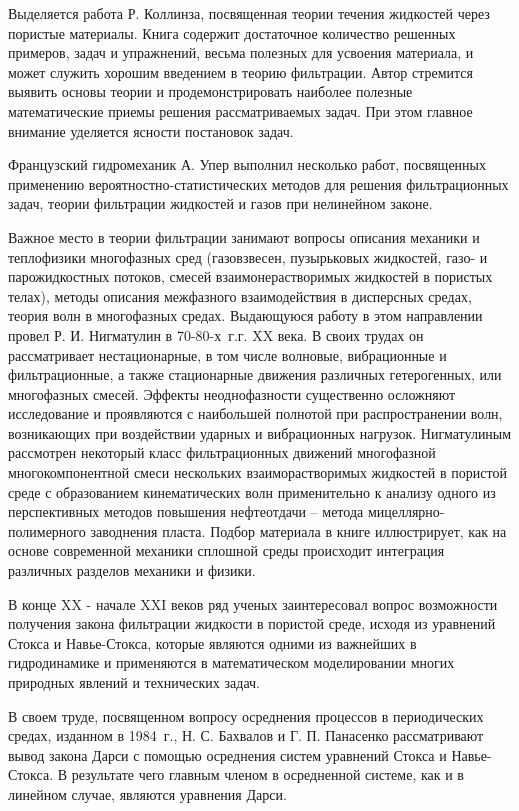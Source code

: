 Выделяется работа Р. Коллинза, посвященная теории течения жидкостей через пористые материалы. Книга содержит достаточное количество решенных примеров, задач и упражнений, весьма полезных для усвоения 
материала, и может служить хорошим введением в теорию фильтрации. Автор стремится выявить основы теории и продемонстрировать наиболее полезные математические приемы решения рассматриваемых задач. При этом главное внимание
уделяется ясности постановок задач.

Французский гидромеханик А. Упер выполнил несколько работ, посвященных применению вероятностно-статистических методов для решения фильтрационных задач, теории фильтрации жидкостей и газов при нелинейном законе.

Важное место в теории фильтрации занимают вопросы описания механики и теплофизики многофазных сред (газовзвесен, пузырьковых жидкостей, газо- и парожидкостных потоков, смесей взаимонерастворимых жидкостей в пористых телах),
методы описания межфазного взаимодействия в дисперсных средах, теория волн в многофазных средах.
Выдающуюся работу в этом направлении провел Р. И. Нигматулин в 70-80-х~г.г. XX века. В своих трудах он рассматривает нестационарные, в том числе волновые, вибрационные и фильтрационные, а также стационарные движения различных 
гетерогенных, или многофазных смесей. Эффекты неоднофазности существенно осложняют исследование и проявляются с наибольшей полнотой при распространении волн, возникающих при воздействии ударных и вибрационных нагрузок. 
Нигматулиным рассмотрен некоторый класс фильтрационных движений многофазной многокомпонентной смеси нескольких взаиморастворимых жидкостей в пористой среде с образованием кинематических волн применительно к анализу одного
из перспективных методов повышения нефтеотдачи -- метода мицеллярно-полимерного заводнения пласта. Подбор материала в книге иллюстрирует, как на основе современной механики сплошной среды происходит интеграция различных 
разделов механики и физики.

В конце XX - начале XXI веков ряд ученых заинтересовал вопрос возможности получения закона фильтрации жидкости в пористой среде, исходя из уравнений Стокса и Навье-Стокса, которые являются одними из важнейших в гидродинамике 
и применяются в математическом моделировании многих природных явлений и технических задач.

В своем труде, посвященном вопросу осреднения процессов в периодических средах, изданном в 1984~г., Н. С. Бахвалов и Г. П. Панасенко рассматривают вывод закона Дарси с помощью осреднения систем уравнений Стокса и Навье-Стокса.
В результате чего главным членом в осредненной системе, как и в линейном случае, являются уравнения Дарси.

